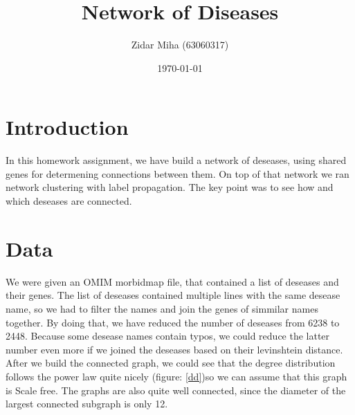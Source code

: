 \documentclass[a4paper,11pt]{article}
\title{Network of Diseases}
\author{Zidar Miha (63060317)}
\date{\today}
\begin{document}
\maketitle

\section{Introduction}


In this homework assignment, we have build a network of deseases, using shared genes for determening connections between them. On top of that network we ran network clustering with label propagation. The key point was to see how and which deseases are connected.

\section{Data}

We were given an OMIM morbidmap file, that contained a list of deseases and their genes. The list of deseases contained multiple lines with the same desease name, so we had to filter the names and join the genes of simmilar names together. By doing that, we have reduced the number of deseases from 6238 to 2448. Because some desease names contain typos, we could reduce the latter number even more if we joined the deseases based on their levinshtein distance. \\

After we build the connected graph, we could see that the degree distribution follows the power law quite nicely (figure: \ref{dd})so we can assume that this graph is Scale free. The graphs are also quite well connected, since the diameter of the largest connected subgraph is only 12. 
\end{document}
